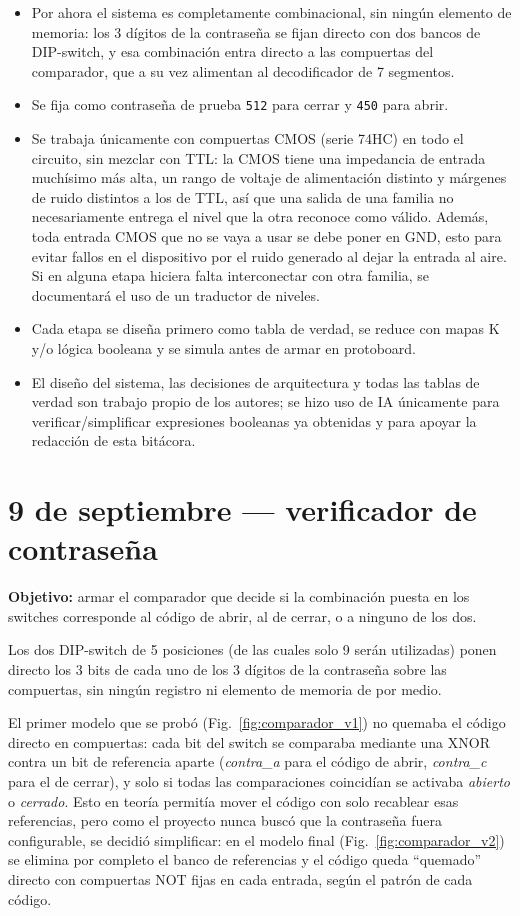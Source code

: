 \documentclass[10pt,conference]{IEEEtran}
\begin{document}
	\begin{itemize}
		\item Por ahora el sistema es completamente combinacional, sin ning\'un elemento de memoria: los 3
		d\'igitos de la contrase\~na se fijan directo con dos bancos de DIP-switch, y esa combinaci\'on
		entra directo a las compuertas del comparador, que a su vez alimentan al decodificador de 7
		segmentos.
		\item Se fija como contrase\~na de prueba \texttt{512} para cerrar y \texttt{450} para abrir.
		\item Se trabaja \'unicamente con compuertas CMOS (serie 74HC) en todo el circuito, sin mezclar con
		TTL: la CMOS tiene una impedancia de entrada much\'isimo m\'as alta, un rango de voltaje de
		alimentaci\'on distinto y m\'argenes de ruido distintos a los de TTL, as\'i que una salida de una
		familia no necesariamente entrega el nivel que la otra reconoce como v\'alido. Adem\'as, toda
		entrada CMOS que no se vaya a usar se debe poner en GND, esto para evitar fallos en el dispositivo por el ruido generado al dejar la entrada al aire. Si en alguna etapa hiciera
		falta interconectar con otra familia, se documentar\'a el uso de un traductor de niveles.
		\item Cada etapa se dise\~na primero como tabla de verdad, se reduce con mapas K y/o l\'ogica booleana y se simula antes
		de armar en protoboard.
		\item El dise\~no del sistema, las decisiones de arquitectura y todas las tablas de verdad son
		trabajo propio de los autores; se hizo uso de IA \'unicamente para verificar/simplificar
		expresiones booleanas ya obtenidas y para apoyar la redacci\'on de esta bit\'acora.
	\end{itemize}
	
	\section{9 de septiembre --- verificador de contrase\~na}
	\textbf{Objetivo:} armar el comparador que decide si la combinaci\'on puesta en los switches
	corresponde al c\'odigo de abrir, al de cerrar, o a ninguno de los dos.
	
	Los dos DIP-switch de 5 posiciones (de las cuales solo 9 ser\'an utilizadas) ponen directo los 3 bits
	de cada uno de los 3 d\'igitos de la contrase\~na sobre las compuertas, sin ning\'un registro ni
	elemento de memoria de por medio.
	
	El primer modelo que se prob\'o (Fig.~\ref{fig:comparador_v1}) no quemaba el c\'odigo directo en
	compuertas: cada bit del switch se comparaba mediante una XNOR contra un bit de referencia aparte
	(\emph{contra\_a} para el c\'odigo de abrir, \emph{contra\_c} para el de cerrar), y solo si todas las
	comparaciones coincid\'ian se activaba \emph{abierto} o \emph{cerrado}. Esto en teor\'ia permit\'ia
	mover el c\'odigo con solo recablear esas referencias, pero como el proyecto nunca busc\'o que la
	contrase\~na fuera configurable, se decidi\'o simplificar: en el modelo final (Fig.~\ref{fig:comparador_v2})
	se elimina por completo el banco de referencias y el c\'odigo queda ``quemado'' directo con compuertas
	NOT fijas en cada entrada, seg\'un el patr\'on de cada c\'odigo.
	
\end{document}
